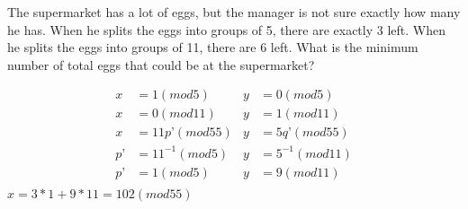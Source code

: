 \question The supermarket has a lot of eggs, but the manager is not sure exactly how many he has. When he splits the eggs into groups of 5, there are exactly 3 left. When he splits the eggs into groups of 11, there are 6 left. What is the minimum number of total eggs that could be at the supermarket?
\begin{solution}[1.5 in]
\begin{align*}
x&=1(mod  5) & y&=0(mod  5) \\
x &= 0 (mod  11) & y &= 1 (mod  11) \\
x &= 11p’ (mod  55) & y &= 5q’ (mod  55) \\
p’ &= 11^{-1} (mod  5) & y &= 5^{-1} (mod  11) \\
p’ &= 1 (mod  5) & y &= 9 (mod  11) \\
\end{align*}
$x = 3 * 1 + 9 * 11 = 102 (mod  55)$ \\
\end{solution}

